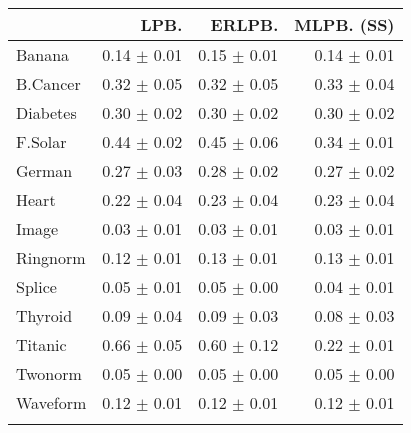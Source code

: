\begin{tabular}{lrrr}
    \toprule
	         &            LPB. &          ERLPB. &      MLPB. (SS) \\ \midrule \addlinespace[0.5em]
	Banana   & 0.14 $\pm$ 0.01 & 0.15 $\pm$ 0.01 & 0.14 $\pm$ 0.01 \\          \addlinespace[0.5em]
	B.Cancer & 0.32 $\pm$ 0.05 & 0.32 $\pm$ 0.05 & 0.33 $\pm$ 0.04 \\          \addlinespace[0.5em]
	Diabetes & 0.30 $\pm$ 0.02 & 0.30 $\pm$ 0.02 & 0.30 $\pm$ 0.02 \\          \addlinespace[0.5em]
	F.Solar  & 0.44 $\pm$ 0.02 & 0.45 $\pm$ 0.06 & 0.34 $\pm$ 0.01 \\          \addlinespace[0.5em]
	German   & 0.27 $\pm$ 0.03 & 0.28 $\pm$ 0.02 & 0.27 $\pm$ 0.02 \\          \addlinespace[0.5em]
	Heart    & 0.22 $\pm$ 0.04 & 0.23 $\pm$ 0.04 & 0.23 $\pm$ 0.04 \\          \addlinespace[0.5em]
	Image    & 0.03 $\pm$ 0.01 & 0.03 $\pm$ 0.01 & 0.03 $\pm$ 0.01 \\          \addlinespace[0.5em]
	Ringnorm & 0.12 $\pm$ 0.01 & 0.13 $\pm$ 0.01 & 0.13 $\pm$ 0.01 \\          \addlinespace[0.5em]
	Splice   & 0.05 $\pm$ 0.01 & 0.05 $\pm$ 0.00 & 0.04 $\pm$ 0.01 \\          \addlinespace[0.5em]
	Thyroid  & 0.09 $\pm$ 0.04 & 0.09 $\pm$ 0.03 & 0.08 $\pm$ 0.03 \\          \addlinespace[0.5em]
	Titanic  & 0.66 $\pm$ 0.05 & 0.60 $\pm$ 0.12 & 0.22 $\pm$ 0.01 \\          \addlinespace[0.5em]
	Twonorm  & 0.05 $\pm$ 0.00 & 0.05 $\pm$ 0.00 & 0.05 $\pm$ 0.00 \\          \addlinespace[0.5em]
	Waveform & 0.12 $\pm$ 0.01 & 0.12 $\pm$ 0.01 & 0.12 $\pm$ 0.01 \\          \addlinespace[0.5em]
    \bottomrule
\end{tabular}
